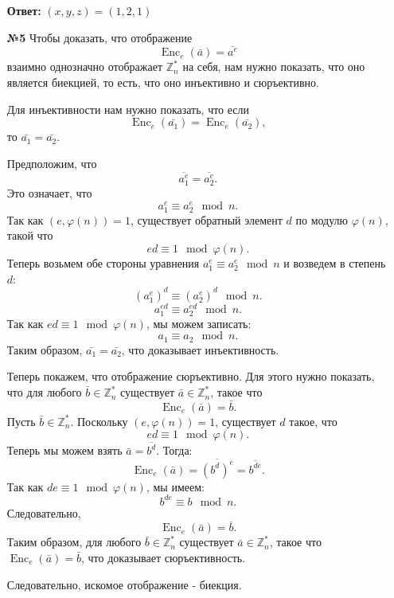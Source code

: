 \documentclass[a4paper]{article}
\begin{document}
\begin{enumerate}
    \textbf{Ответ: }$(x, y, z) = (1, 2, 1)$\\

    \item[\textbf{№5}]Чтобы доказать, что отображение 
    $$
    \operatorname{Enc}_{e}(\bar{a})=\overline{a^{e}}
    $$
    взаимно однозначно отображает $\mathbb{Z}_{n}^{*}$ на себя, нам нужно показать, что оно является биекцией, то есть, что оно инъективно и сюръективно.
    
    Для инъективности нам нужно показать, что если 
    $$
    \operatorname{Enc}_{e}(\bar{a_1}) = \operatorname{Enc}_{e}(\bar{a_2}),
    $$
    то $\bar{a_1} = \bar{a_2}$.

    Предположим, что 
    $$
    \overline{a_1^e} = \overline{a_2^e}.
    $$
    Это означает, что 
    $$
    a_1^e \equiv a_2^e \mod n.
    $$
    Так как $(e, \varphi(n)) = 1$, существует обратный элемент $d$ по модулю $\varphi(n)$, такой что 
    $$
    ed \equiv 1 \mod \varphi(n).
    $$
    Теперь возьмем обе стороны уравнения $a_1^e \equiv a_2^e \mod n$ и возведем в степень $d$:
    $$
    (a_1^e)^d \equiv (a_2^e)^d \mod n.
    $$
    $$
    a_1^{ed} \equiv a_2^{ed} \mod n.
    $$
    Так как $ed \equiv 1 \mod \varphi(n)$, мы можем записать:
    $$
    a_1 \equiv a_2 \mod n.
    $$
    Таким образом, $\bar{a_1} = \bar{a_2}$, что доказывает инъективность.

    Теперь покажем, что отображение сюръективно. Для этого нужно показать, что для любого $\bar{b} \in \mathbb{Z}_{n}^{*}$ существует $\bar{a} \in \mathbb{Z}_{n}^{*}$, такое что 
    $$
    \operatorname{Enc}_{e}(\bar{a}) = \bar{b}.
    $$
    Пусть $\bar{b} \in \mathbb{Z}_{n}^{*}$. Поскольку $(e, \varphi(n)) = 1$, существует $d$ такое, что 
    $$
    ed \equiv 1 \mod \varphi(n).$$
    Теперь мы можем взять $\bar{a} = \overline{b^d}$. Тогда:
    $$
    \operatorname{Enc}_{e}(\bar{a}) = \overline{(b^d)^e} = \overline{b^{de}}.
    $$
    Так как $de \equiv 1 \mod \varphi(n)$, мы имеем:
    $$
    b^{de} \equiv b \mod n.
    $$
    Следовательно,
    $$
    \operatorname{Enc}_{e}(\bar{a}) = \overline{b}.
    $$
    Таким образом, для любого $\bar{b} \in \mathbb{Z}_{n}^{*}$ существует $\bar{a} \in \mathbb{Z}_{n}^{*}$, такое что $\operatorname{Enc}_{e}(\bar{a}) = \bar{b}$, что доказывает сюръективность.

    Следовательно, искомое отображение - биекция.


\end{enumerate}
\end{document}
